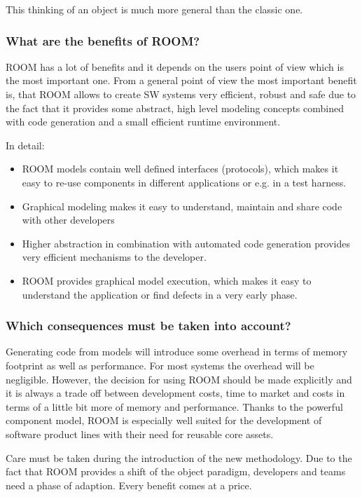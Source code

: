 This thinking of an object is much more general than the classic one.  

\subsubsection{What are the benefits of ROOM?}

ROOM has a lot of benefits and it depends on the users point of view which is the most important one. From a general
point of view the most important benefit is, that ROOM allows to create SW systems very efficient, robust and safe
due to the fact that it provides some abstract, high level modeling concepts combined with code generation and a
small efficient runtime environment.  

In detail:
\begin{itemize}
\item ROOM models contain well defined interfaces (protocols), which makes it easy to re-use components in different
applications or e.g. in a test harness. 
\item Graphical modeling makes it easy to understand, maintain and share code with other developers
\item Higher abstraction in combination with automated code generation provides very efficient mechanisms to
the developer. 
\item ROOM provides graphical model execution, which makes it easy to understand the application or find defects in
a very early phase. 
\end{itemize}

\subsubsection{Which consequences must be taken into account?}

Generating code from models will introduce some overhead in terms of memory footprint as well as performance.
For most systems the overhead will be negligible. However, the decision for using ROOM should be made explicitly
and it is always a trade off between development costs, time to market and costs in terms of a little bit more of
memory and performance. Thanks to the powerful component model, ROOM is especially well suited for the development
of software product lines with their need for reusable core assets.  
  
Care must be taken during the introduction of the new methodology. Due to the fact that ROOM provides a shift of the
object paradigm, developers and teams need a phase of adaption. Every benefit comes at a price.

